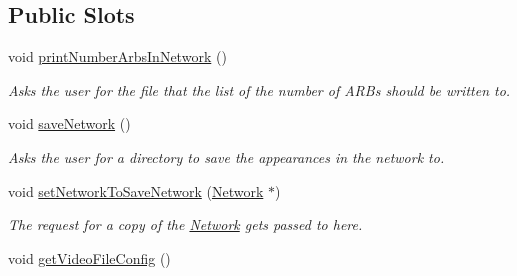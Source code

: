 \subsection*{Public Slots}
\begin{DoxyCompactItemize}
\item 
\hypertarget{class_qt_widget_image_display_aa65978984820243b551d99592342e8bc}{}void \hyperlink{class_qt_widget_image_display_aa65978984820243b551d99592342e8bc}{print\+Number\+Arbs\+In\+Network} ()\label{class_qt_widget_image_display_aa65978984820243b551d99592342e8bc}

\begin{DoxyCompactList}\small\item\em Asks the user for the file that the list of the number of A\+R\+Bs should be written to. \end{DoxyCompactList}\item 
\hypertarget{class_qt_widget_image_display_af1ec2373cfac14c17d4be8ea014aac7a}{}void \hyperlink{class_qt_widget_image_display_af1ec2373cfac14c17d4be8ea014aac7a}{save\+Network} ()\label{class_qt_widget_image_display_af1ec2373cfac14c17d4be8ea014aac7a}

\begin{DoxyCompactList}\small\item\em Asks the user for a directory to save the appearances in the network to. \end{DoxyCompactList}\item 
void \hyperlink{class_qt_widget_image_display_af57a98200b443711d226b079fa3a886a}{set\+Network\+To\+Save\+Network} (\hyperlink{class_network}{Network} $\ast$)
\begin{DoxyCompactList}\small\item\em The request for a copy of the \hyperlink{class_network}{Network} gets passed to here. \end{DoxyCompactList}\item 
\hypertarget{class_qt_widget_image_display_a5730944e528e82ec7bbe6ef71fd02e6b}{}void \hyperlink{class_qt_widget_image_display_a5730944e528e82ec7bbe6ef71fd02e6b}{get\+Video\+File\+Config} ()\label{class_qt_widget_image_display_a5730944e528e82ec7bbe6ef71fd02e6b}


\end{DoxyCompactItemize}

